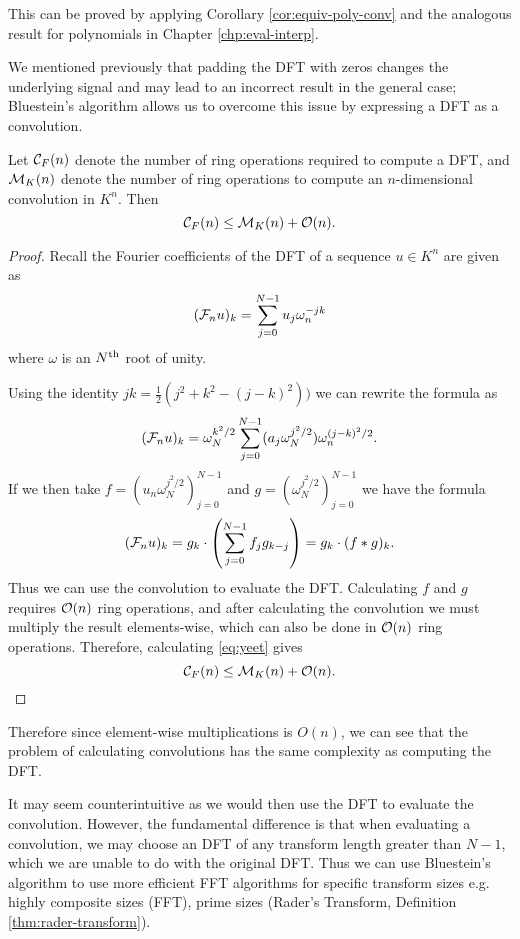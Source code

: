 This can be proved by applying Corollary \ref{cor:equiv-poly-conv} and the analogous result for polynomials in Chapter \ref{chp:eval-interp}.

We mentioned previously that padding the DFT with zeros changes the underlying signal and may lead to an incorrect result in the general case; Bluestein's algorithm allows us to overcome this issue by expressing a DFT as a convolution.

\begin{proposition}
    Let $\mathcal C_F(n)$ denote the number of ring operations required to compute a DFT, and $\mathcal M_K(n)$ denote the number of ring operations to compute an $n$-dimensional convolution in $K^n$. Then
    \[
        \mathcal C_F(n) \le \mathcal M_K(n) + \mathcal O(n).
    \]
\end{proposition}

\begin{proof}
    Recall the Fourier coefficients of the DFT of a sequence $u \in K^n$ are given as
    \[
        (\mathcal F_n u)_k = \sum^{N-1}_{j=0} u_j\omega_n^{-jk}
    \]
    where $\omega$ is an $N^{\textrm{th}}$ root of unity.

    Using the identity $jk = \frac{1}{2}(j^2 + k^2 - (j - k)^2))$ we can rewrite the formula as
    \[
        (\mathcal F_n u)_k = \omega_N^{k^2/2} \sum^{N-1}_{j=0} (a_j \omega_N^{j^2/2}) \omega_n^{(j - k)^2/2}.
    \]
    If we then take $f = (u_n \omega_N^{j^2/2})_{j=0}^{N-1}$ and $g = (\omega_N^{j^2/2})_{j=0}^{N-1}$ we have the formula
    \begin{equation}\label{eq:yeet}
        (\mathcal F_n u)_k = g_k \cdot \left(\sum^{N-1}_{j=0} f_j g_{k-j}\right) = g_k \cdot (f \ast g)_k.
    \end{equation}
    Thus we can use the convolution to evaluate the DFT. Calculating $f$ and $g$ requires $\mathcal O(n)$ ring operations, and after calculating the convolution we must multiply the result elements-wise, which can also be done in $\mathcal O(n)$ ring operations. Therefore, calculating \eqref{eq:yeet} gives
    \[
        \mathcal C_F(n) \le \mathcal M_K(n) + \mathcal O(n).
    \]
\end{proof}

Therefore since element-wise multiplications is $O(n)$, we can see that the problem of calculating convolutions has the same complexity as computing the DFT.

It may seem counterintuitive as we would then use the DFT to evaluate the convolution. However, the fundamental difference is that when evaluating a convolution, we may choose an DFT of any transform length greater than $N - 1$, which we are unable to do with the original DFT. Thus we can use Bluestein's algorithm\cite{bluestein} to use more efficient FFT algorithms for specific transform sizes e.g. highly composite sizes (FFT), prime sizes (Rader's Transform, Definition \ref{thm:rader-transform}).

